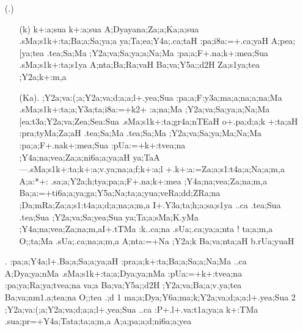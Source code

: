 \begin{spacing}{1.15}
\begin{itemize}
\item[({\sktf 14}.)]
\begin{itemize}
    \item[({\sktf k})] {\sktf k+:a;sua k+:a;sua {A;Dya}{ya}{na};Za;a;Ka;a;sua
.sMa;s1k+:ta;Ba;a;Sa;ya;a ya;Ta;ea;Y4a;.ca;taH
:pa;i8a:=+.ca;yaH A;pea;[ya;tea .tea;Sa;Ma ;Y2a;va;Sa;ya;a;Na;Ma
:pa;a;F+.na;k+:mea;Sua .sMa;s1k+:ta;s1ya
A;nta;Ba;Ra;vaH Ba;va;Y5a;;d2H Za;s1ya;tea
;Y2a;k+:m,a}
                
    \item[({\sktf Ka}).]
{\sktf ;Y2a;va:(;a{;Y2a;va;d;a;a};l+.yea;Sua
:pa;a;F:y3a;ma;a;na;a;na;Ma .sMa;s1k+:ta;a;Y3a;ta;i8a:=+k2+%
:a;na;Ma ;Y2a;va;Sa;ya;a;Na;Ma [ea:t3a;Y2a;va;Zea{;Sea}{:Sua}
.sMa;s1k+:ta;gr4a;nTEaH o+.pa;d;a;k%
+:ta;aH :pra;tyMa;Za;aH .tea;Sa;Ma .tea;Sa;Ma
;Y2a;va;Sa;ya;Ma;Na;Ma :pa;a;F+.na\ZF{-}k+:mea;Sua :pUa:=+k+:tvea;na
;Y4a;na;vea;Za;a;ni6a;a;ya;aH\ZF{,} ya;TaA}{\rm---}{\sktf .sMa;s1k+:ta;k+:a;v.ya;na;a;f;k+:a;l%
+.k+:a:=\ZF{-}Za;a;s1:t4a;a;Na;a;m,a A;a:*+:%
\ZF{-}.sa;a;Y2a;h;tya;pa;a;F+.na;k+:mea ;Y4a;na;vea;Za;na;m,a\ZF{,}
Ba;a:=+ti6a;a;ya;ga;Y5a;Na;ta;a;yua;veRa;d\ZF{-}d;ZRa;na%
\ZF{-};Da;mRa;Za;a;s1:t4a;a;d;a;na;a;m,a\break
I+.Y3a;ta;h;a;sa;s1ya ..ca .tea;Sua .tea;Sua ;Y2a;va;Sa;yea;Sua
ya;Ta;a;sMa;K.yMa ;Y4a;na;vea;Za;na;m,a\ZF{---}I+.tTMa :k..ca;na .sUa;.ca;ya;a;nta} ! {\sktf ta;a;m,a O;;ta;Ma
.sUa;.ca;na;a;m,a A;nta:=+Na ;Y2a;k Ba;va;nta;aH
b.rUa;yuaH}
     \end{itemize}
              
 \item[{\sktf 15}.]  
{\sktf :pa;a;Y4a;l+.Ba;a;Sa;a;ya;aH :pra;a;k+:ta;Ba;a;Sa;a;Na;Ma ..ca A;Dya;ya;nMa .sMa;s1k+:ta;a;Dya;ya;nMa :pUa:=+k+:tvea;na :pa;ya;Ra;ya;tvea;na va;a
Ba;va;Y5a;;d2H ;Y2a;va;Ba;a;v.ya;tea
Ba;va;nm1.a;tea;na O;;tea .;d \ZF{(}1\ZF{)}
ma;a;Dya;Y6a;ma;k\ZF{-};Y2a;va;d;a;a;l+.yea;Sua \ZF{(}2\ZF{)}
;Y2a;va:(;a;Y2a;va;d;a;a;l+.yea;Sua ..ca :P+.l+.va:t1a;ya;a
k+:TMa .sua;pr=+Y4a;Tata;ta;a;m,a A;a;pa;a;d;ni6a;a;yea} 
 

\end{itemize}
\end{spacing}
